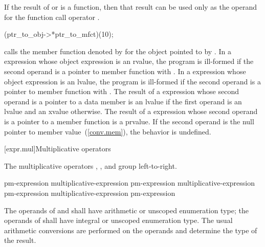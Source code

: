 \pnum
{}%
If the result of  or \tcode{->*} is a function, then that
result can be used only as the operand for the function call operator
\tcode{()}.
\enterexample 

\begin{codeblock}
(ptr_to_obj->*ptr_to_mfct)(10);
\end{codeblock}

calls the member function denoted by  for the object
pointed to by .
\exitexample 
In a  expression whose object expression is an rvalue, the program is
ill-formed if the second operand is a pointer to member function with
 \tcode{\&}.
In a 
expression whose object expression is an lvalue, the program is ill-formed if the second
operand is a pointer to member function with  \tcode{\&\&}.
The result of a  expression
whose second operand is a pointer to a data member is an lvalue if the first
operand is an lvalue and an xvalue otherwise. The result of a  expression whose
second operand is a pointer to a member function is a prvalue.
If the second operand is the null
pointer to member value~(\ref{conv.mem}), the behavior is undefined.

[expr.mul]{Multiplicative operators}%
%

\pnum
The multiplicative operators \tcode{*}, \tcode{/}, and \tcode{\%} group
left-to-right.

%
%
%
%
%
%
%
%
\begin{bnf}
\br
    pm-expression\br
    multiplicative-expression \terminal{*} pm-expression\br
    multiplicative-expression \terminal{/} pm-expression\br
    multiplicative-expression \terminal{\%} pm-expression
\end{bnf}

\pnum
The operands of \tcode{*} and \tcode{/} shall have arithmetic or unscoped
enumeration type; the operands of \tcode{\%} shall have integral or unscoped
enumeration type. The usual arithmetic conversions are performed on the
operands and determine the type of the result.

